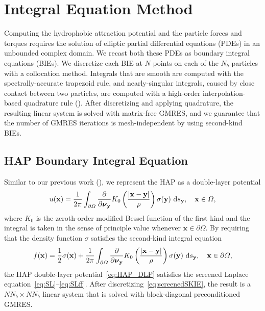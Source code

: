 \documentclass[lineno]{jfm}
\newcommand{\bd}{\partial}
\newcommand{\nnu}{\boldsymbol{\nu}}
\newcommand{\xx}{\mathbf{x}}
\newcommand{\yy}{\mathbf{y}}
\newcommand{\pderiv}[2]{\frac{\partial #1}{\partial #2}}
\begin{document}
\section{Integral Equation Method}
\label{sec:IEM}
Computing the hydrophobic attraction potential and the particle forces
and torques requires the solution of elliptic partial differential
equations (PDEs) in an unbounded complex domain. We recast both these
PDEs as boundary integral equations (BIEs). We discretize each BIE at
$N$ points on each of the $N_b$ particles with a collocation method.
Integrals that are smooth are computed with the spectrally-accurate
trapezoid rule, and nearly-singular integrals, caused by close contact
between two particles, are computed with a high-order
interpolation-based quadrature rule (\cite{qua-bir2014}). After
discretizing and applying quadrature, the resulting linear system is
solved with matrix-free GMRES, and we guarantee that the number of GMRES
iterations is mesh-independent by using second-kind BIEs.


\subsection{HAP Boundary Integral Equation}
Similar to our previous work (\cite{Fu20}), we represent the HAP as a
double-layer potential
\begin{align}
  \label{eq:HAP_DLP}
  u(\xx) = \frac{1}{2\pi} \int_{\bd\Omega} \pderiv{}{\nnu_\yy}
    K_0 \left(\frac{|\xx - \yy|}{\rho}\right) \sigma(\yy) \, \dif s_\yy,
    \quad \xx \in \Omega,
\end{align}
where $K_0$ is the zeroth-order modified Bessel function of the first
kind and the integral is taken in the sense of principle value whenever $\xx \in \partial \Omega$. 
By requiring that the density function $\sigma$ satisfies the
second-kind integral equation
\begin{equation}
\label{eq:screenedSKIE}
  f(\xx) = \frac{1}{2}\sigma(\xx) + 
    \frac{1}{2\pi}\int_{\bd\Omega} \pderiv{}{\nnu_\yy}
    K_0 \left(\frac{|\xx - \yy|}{\rho}\right) \sigma(\yy) \, \dif s_\yy,
    \quad \xx \in \bd\Omega,
\end{equation}
the HAP double-layer potential~\eqref{eq:HAP_DLP} satisfies the screened
Laplace equation~\eqref{eq:SL}--\eqref{eq:SLff}. After
discretizing~\eqref{eq:screenedSKIE}, the result is a $NN_b \times NN_b$
linear system that is solved with block-diagonal preconditioned GMRES.
\end{document}
